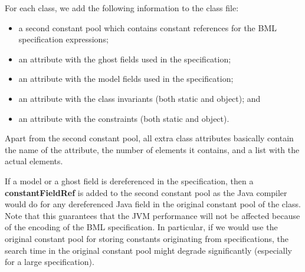 For each class, we add the following information to the class file:
\begin{itemize}
\item a second constant pool which contains constant references
      for the BML specification expressions;
\item an attribute with the ghost fields used in the specification;
\item an attribute with the model fields used in the specification;
\item an attribute with the class invariants (both static and object); and
\item an attribute with the constraints (both static and object).
\end{itemize}
Apart from the second constant pool, all extra class attributes
basically contain the name of the attribute, the number of elements it
contains, and a list with the actual elements.

If a model or a ghost field is dereferenced in the specification, then
a \textbf{constantFieldRef} is added to the second constant pool as
the Java compiler would do for any dereferenced Java field in the
original constant pool of the class. Note that this guarantees that
the JVM performance will not be affected because of the encoding of
the BML specification.  In particular, if we would use the original
constant pool for storing constants originating from specifications,
the search time in the original constant pool might degrade
significantly (especially for a large specification).



